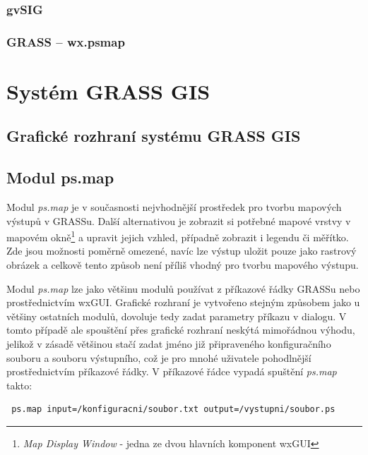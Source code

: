 \documentclass[a4paper,12pt,draft]{article}
\newcommand{\modul}[1]{\emph{#1}}
\begin{document}
\subsubsection{gvSIG}

\subsubsection{GRASS -- wx.psmap}


\section{Systém GRASS GIS}

\subsection{Grafické rozhraní systému GRASS GIS}

\subsection{Modul ps.map}
\label{sec:psmap}
Modul \modul{ps.map} je v současnosti nejvhodnější prostředek pro tvorbu mapových výstupů v GRASSu. Další alternativou je zobrazit si potřebné mapové vrstvy v mapovém okně\footnote{\emph{Map Display Window} - jedna ze dvou hlavních komponent wxGUI} a upravit jejich vzhled, případně zobrazit i legendu či měřítko. Zde jsou možnosti poměrně omezené, navíc lze výstup uložit pouze jako rastrový obrázek a celkově tento způsob není příliš vhodný pro tvorbu mapového výstupu.

Modul \modul{ps.map} lze jako většinu modulů používat z příkazové řádky GRASSu nebo pro\-střed\-nic\-tvím wxGUI. Grafické rozhraní je vytvořeno stejným způsobem jako u většiny ostatních modulů, dovoluje tedy zadat parametry příkazu v dialogu. V tomto případě ale spouštění přes grafické rozhraní neskýtá mimořádnou výhodu, jelikož v zásadě většinou stačí zadat jméno již připraveného konfiguračního souboru a souboru výstupního, což je pro mnohé uživatele pohodlnější prostřednictvím příkazové řádky. V příkazové řádce vypadá spuštění \modul{ps.map} takto:
\begin{verbatim}
 ps.map input=/konfiguracni/soubor.txt output=/vystupni/soubor.ps   
\end{verbatim}
\end{document}
